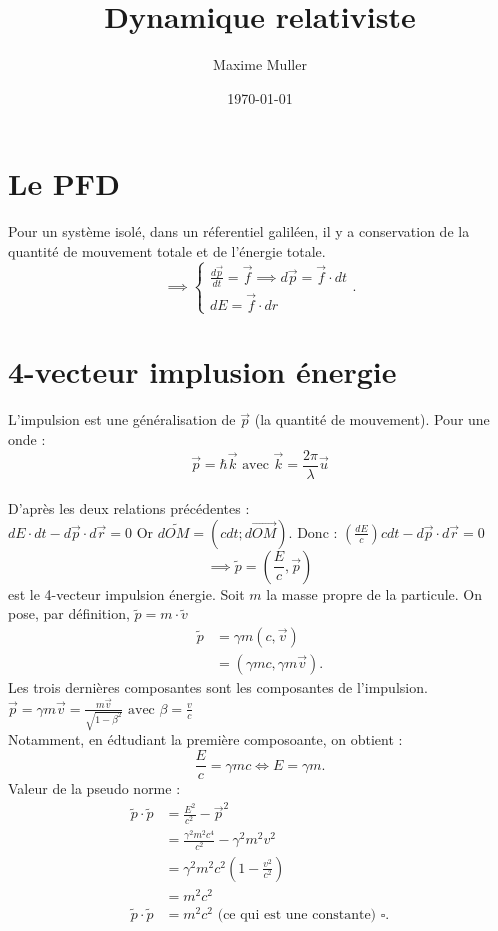\documentclass{article}
\title{Dynamique relativiste}
\author{Maxime Muller}
\date{\today}
\begin{document}
\maketitle
\pagebreak
\section{Le PFD}
Pour un système isolé, dans un réferentiel galiléen, il y a conservation de la quantité de mouvement totale et de l'énergie totale.\\
\[
\implies\begin{cases}
    \frac{d\vec{p}}{dt} = \vec{f}\implies d\vec{p} = \vec{f}\cdot dt\\
    dE = \vec{f}\cdot dr
\end{cases}
.\] 
\section{4-vecteur implusion énergie}
L'impulsion est une généralisation de \(\vec{p}\) (la quantité de mouvement). Pour une onde :  \\
\[\vec{p} = \hbar \vec{k} \text{ avec } \vec{k} = \frac{2\pi}{\lambda}\vec{u}\]\\
D'après les deux relations précédentes : \\
\(dE \cdot dt -d\vec{p} \cdot d\vec{r} = 0\) Or \(d\tilde{OM} = (cdt;d\vec{OM})\). Donc : \((\frac{dE}{c})cdt - d\vec{p}\cdot d\vec{r} = 0\)\\
\[
\implies \tilde{p} = \left(\frac{E}{c}, \vec{p}\right)
\]
est le 4-vecteur impulsion énergie.
Soit \(m\) la masse propre de la particule. On pose, par définition, \(\tilde{p} = m\cdot \tilde{v}\)\\
\begin{align*}
    \tilde{p} &= \gamma m (c, \vec{v}) \\
              &= (\gamma m c, \gamma m \vec{v}).
\end{align*}
Les trois dernières composantes sont les composantes de l'impulsion.\\
\(\vec{p} = \gamma m \vec{v} = \frac{m\vec{v}}{\sqrt{1-\beta ^2} } \text{ avec } \beta = \frac{v}{c}\)\\
Notamment, en édtudiant la première composoante, on obtient : 
\[
\frac{E}{c} = \gamma m c \Leftrightarrow E = \gamma m
.\] 
Valeur de la pseudo norme : 
\begin{align*}
    \tilde{p}\cdot \tilde{p} &= \frac{E^2}{c^2\, } - \vec{p}^2\\
    &= \frac{\gamma ^2 m^2 c^{4}}{c^2} - \gamma ^2 m^2 v^2 \\
    &= \gamma ^2 m^2 c^2 (1-\frac{v^2}{c^2}) \\
    &= m^2c^2 \\
    \tilde{p}\cdot \tilde{p} &= m^2c^2 \text{ (ce qui est une constante) } \square
.\end{align*}
\end{document}

